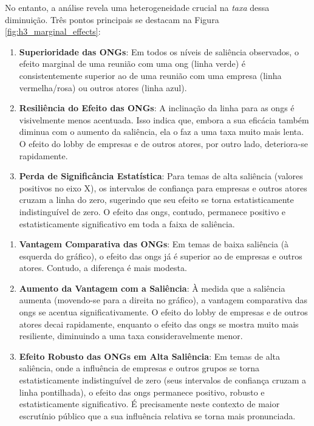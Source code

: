 No entanto, a análise revela uma heterogeneidade crucial na \textit{taxa} dessa diminuição. Três pontos principais se destacam na Figura \ref{fig:h3_marginal_effects}:
\begin{enumerate}
    \item \textbf{Superioridade das ONGs}: Em todos os níveis de saliência observados, o efeito marginal de uma reunião com uma \acrshort{ong} (linha verde) é consistentemente superior ao de uma reunião com uma empresa (linha vermelha/rosa) ou outros atores (linha azul).
    
    \item \textbf{Resiliência do Efeito das ONGs}: A inclinação da linha para as \acrshort{ong}s é visivelmente menos acentuada. Isso indica que, embora a sua eficácia também diminua com o aumento da saliência, ela o faz a uma taxa muito mais lenta. O efeito do lobby de empresas e de outros atores, por outro lado, deteriora-se rapidamente.
    
    \item \textbf{Perda de Significância Estatística}: Para temas de alta saliência (valores positivos no eixo X), os intervalos de confiança para empresas e outros atores cruzam a linha do zero, sugerindo que seu efeito se torna estatisticamente indistinguível de zero. O efeito das \acrshort{ong}s, contudo, permanece positivo e estatisticamente significativo em toda a faixa de saliência.
\end{enumerate}

\begin{enumerate}
    \item \textbf{Vantagem Comparativa das ONGs}: Em temas de baixa saliência (à esquerda do gráfico), o efeito das \acrshort{ong}s já é superior ao de empresas e outros atores. Contudo, a diferença é mais modesta.
    
    \item \textbf{Aumento da Vantagem com a Saliência}: À medida que a saliência aumenta (movendo-se para a direita no gráfico), a vantagem comparativa das \acrshort{ong}s se acentua significativamente. O efeito do lobby de empresas e de outros atores decai rapidamente, enquanto o efeito das \acrshort{ong}s se mostra muito mais resiliente, diminuindo a uma taxa consideravelmente menor.
    
    \item \textbf{Efeito Robusto das ONGs em Alta Saliência}: Em temas de alta saliência, onde a influência de empresas e outros grupos se torna estatisticamente indistinguível de zero (seus intervalos de confiança cruzam a linha pontilhada), o efeito das \acrshort{ong}s permanece positivo, robusto e estatisticamente significativo. É precisamente neste contexto de maior escrutínio público que a sua influência relativa se torna mais pronunciada.
\end{enumerate}



